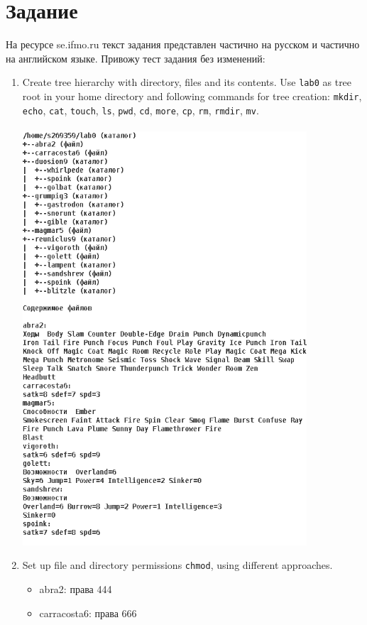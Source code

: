 \documentclass[11pt]{article}
\begin{document}
\section{Задание}
На ресурсе se.ifmo.ru текст задания представлен частично на русском и частично на английском языке. Привожу тест задания без изменений:
\begin{enumerate}
	\item Create tree hierarchy with directory, files and its contents. Use \texttt{lab0} as tree root in your home directory and following commands for tree creation:
	\texttt{mkdir}, \texttt{echo}, \texttt{cat}, \texttt{touch}, \texttt{ls}, \texttt{pwd}, \texttt{cd}, \texttt{more}, \texttt{cp}, \texttt{rm}, \texttt{rmdir}, \texttt{mv}.\\\\
	\includegraphics[width=400px, left]{tree.png}
	\pagebreak{}
	\item Set up file and directory permissions \texttt{chmod}, using different approaches.
	\begin{itemize}
		\item abra2: права 444
		\item carracosta6: права 666

\end{itemize}
\end{enumerate}
\end{document}
